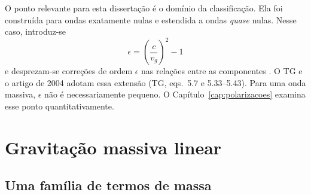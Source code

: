 O ponto relevante para esta dissertação é o domínio da classificação.
Ela foi construída para ondas exatamente nulas e estendida a ondas
\emph{quase} nulas. Nesse caso, introduz-se
\begin{equation}
 \epsilon=\left(\frac{c}{v_g}\right)^2-1
 \label{eq:fund-epsilon}
\end{equation}
e desprezam-se correções de ordem $\epsilon$ nas relações entre as
componentes \autocite{eardley1973}. O TG e o artigo de 2004 adotam essa
extensão (TG, eqs.~5.7 e 5.33--5.43). Para uma onda massiva, $\epsilon$
não é necessariamente pequeno. O Capítulo~\ref{cap:polarizacoes} examina
esse ponto quantitativamente.

\section{Gravitação massiva linear}
\label{sec:fund-massiva}

\subsection{Uma família de termos de massa}

